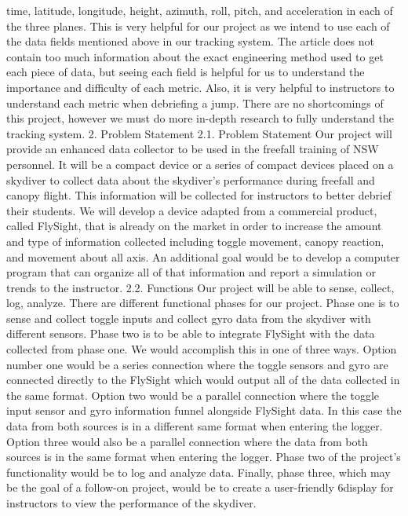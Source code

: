 time, latitude, longitude, height, azimuth, roll, pitch, and acceleration in each of the three planes. This is very helpful for
our project as we intend to use each of the data fields mentioned above in our tracking system. The article does not
contain too much information about the exact engineering method used to get each piece of data, but seeing each field
is helpful for us to understand the importance and difficulty of each metric. Also, it is very helpful to instructors to
understand each metric when debriefing a jump. There are no shortcomings of this project, however we must do more
in-depth research to fully understand the tracking system.
2.
Problem Statement
2.1.
Problem Statement
Our project will provide an enhanced data collector to be used in the freefall training of NSW personnel. It will be a
compact device or a series of compact devices placed on a skydiver to collect data about the skydiver’s performance
during freefall and canopy flight. This information will be collected for instructors to better debrief their students. We
will develop a device adapted from a commercial product, called FlySight, that is already on the market in order to
increase the amount and type of information collected including toggle movement, canopy reaction, and movement
about all axis. An additional goal would be to develop a computer program that can organize all of that information and
report a simulation or trends to the instructor.
2.2.
Functions
Our project will be able to sense, collect, log, analyze. There are different functional phases for our project. Phase one is
to sense and collect toggle inputs and collect gyro data from the skydiver with different sensors. Phase two is to be able
to integrate FlySight with the data collected from phase one. We would accomplish this in one of three ways. Option
number one would be a series connection where the toggle sensors and gyro are connected directly to the FlySight
which would output all of the data collected in the same format. Option two would be a parallel connection where the
toggle input sensor and gyro information funnel alongside FlySight data. In this case the data from both sources is in a
different same format when entering the logger. Option three would also be a parallel connection where the data from
both sources is in the same format when entering the logger. Phase two of the project’s functionality would be to log
and analyze data. Finally, phase three, which may be the goal of a follow-on project, would be to create a user-friendly
6display for instructors to view the performance of the skydiver.
